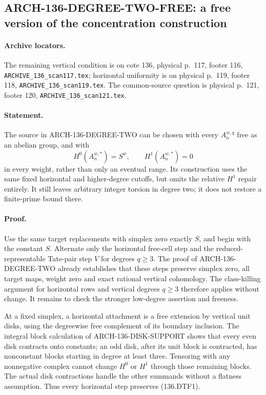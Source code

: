\subsection{ARCH-136-DEGREE-TWO-FREE: a free version of the concentration construction}

\paragraph{Archive locators.}
The remaining vertical condition is on cote 136, physical p.~117,
footer 116, \texttt{ARCHIVE\_136\_scan117.tex}; horizontal uniformity
is on physical p.~119, footer 118, \texttt{ARCHIVE\_136\_scan119.tex}.
The common-source question is physical p.~121, footer 120,
\texttt{ARCHIVE\_136\_scan121.tex}.

\paragraph{Statement.}
The source in ARCH-136-DEGREE-TWO can be chosen with every
$A_n^{w,q}$ free as an abelian group, and with
\[
             H^0(A_n^{w,*})=S^w,\qquad
             H^1(A_n^{w,*})=0                            \tag{136.DTF1}
\]
in every weight, rather than only an eventual range.  Its construction
uses the same fixed horizontal and higher-degree cutoffs, but omits
the relative $H^1$ repair entirely.  It still leaves arbitrary integer
torsion in degree two; it does not restore a finite-prime bound there.

\paragraph{Proof.}
Use the same target replacements with simplex zero exactly $S$,
and begin with the constant $S$.  Alternate only the horizontal
free-cell step and the reduced-representable Tate-pair step $V$
for degrees $q\geq3$.  The proof of ARCH-136-DEGREE-TWO already
establishes that these steps preserve simplex zero, all target maps,
weight zero and exact rational vertical cohomology.  The class-killing
argument for horizontal rows and vertical degrees $q\geq3$ therefore
applies without change.  It remains to check the stronger low-degree
assertion and freeness.

At a fixed simplex, a horizontal attachment is a free extension by
vertical unit disks, using the degreewise free complement of its
boundary inclusion.  The integral block calculation of
ARCH-136-DISK-SUPPORT shows that every even disk contracts onto
constants; an odd disk, after its unit block is contracted, has
nonconstant blocks starting in degree at least three.  Tensoring
with any nonnegative complex cannot change $H^0$ or $H^1$ through
those remaining blocks.  The actual disk contractions handle the
other summands without a flatness assumption.  Thus every horizontal
step preserves (136.DTF1).

